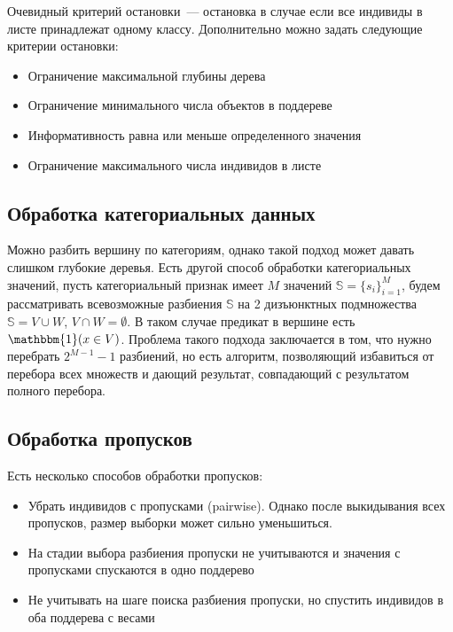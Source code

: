 \documentclass{article}
\theoremstyle{definition}
\theoremstyle{theorem}
\theoremstyle{remark}
\theoremstyle{theorem}
\theoremstyle{example}
\theoremstyle{theorem}
\theoremstyle{theorem}
\theoremstyle{theorem}
\theoremstyle{theorem}
\begin{document}
Очевидный критерий остановки~--- остановка в случае если все индивиды в листе принадлежат одному классу. Дополнительно можно задать следующие критерии остановки:
	\begin{itemize}
		\item Ограничение максимальной глубины дерева
		\item Ограничение минимального числа объектов в поддереве
		\item Информативность равна или меньше определенного значения
		\item Ограничение максимального числа индивидов в листе
	\end{itemize}
	
	\subsection{Обработка категориальных данных}
		Можно разбить вершину по категориям, однако такой подход может давать слишком глубокие деревья. Есть другой способ обработки категориальных значений, пусть категориальный признак имеет $M$ значений $\mathbb S=\{s_i\}_{i=1}^M$, будем рассматривать всевозможные разбиения $\mathbb S$ на 2 дизъюнктных подмножества $\mathbb S=V\cup W$, $V\cap W=\emptyset$. В таком случае предикат в вершине есть $\mathbbm{1}(x\in V)$. Проблема такого подхода заключается в том, что нужно перебрать $2^{M-1}-1$ разбиений, но есть алгоритм, позволяющий избавиться от перебора всех множеств и дающий результат, совпадающий с результатом полного перебора.
	
	\subsection{Обработка пропусков}
		Есть несколько способов обработки пропусков:
		\begin{itemize}
			\item Убрать индивидов с пропусками (pairwise). Однако после выкидывания всех пропусков, размер выборки может сильно уменьшиться.
			\item На стадии выбора разбиения пропуски не учитываются и значения с пропусками спускаются в одно поддерево
			\item Не учитывать на шаге поиска разбиения пропуски, но спустить индивидов в оба поддерева с весами
		\end{itemize}
	\newpage
\end{document}
